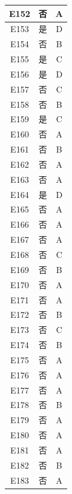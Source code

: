 \documentclass[UTF8]{ctexart}
\begin{document}
\begin{center}
\begin{longtable}{|c|c|c|}
		E152     & 否       & A        \\ \hline
		E153     & 是       & D        \\ \hline
		E154     & 否       & B        \\ \hline
		E155     & 是       & C        \\ \hline
		E156     & 是       & D        \\ \hline
		E157     & 否       & C        \\ \hline
		E158     & 否       & B        \\ \hline
		E159     & 是       & C        \\ \hline
		E160     & 否       & A        \\ \hline
		E161     & 否       & B        \\ \hline
		E162     & 否       & A        \\ \hline
		E163     & 否       & A        \\ \hline
		E164     & 是       & D        \\ \hline
		E165     & 否       & A        \\ \hline
		E166     & 否       & A        \\ \hline
		E167     & 否       & A        \\ \hline
		E168     & 否       & C        \\ \hline
		E169     & 否       & B        \\ \hline
		E170     & 否       & A        \\ \hline
		E171     & 否       & A        \\ \hline
		E172     & 否       & B        \\ \hline
		E173     & 否       & C        \\ \hline
		E174     & 否       & B        \\ \hline
		E175     & 否       & A        \\ \hline
		E176     & 否       & A        \\ \hline
		E177     & 否       & A        \\ \hline
		E178     & 否       & B        \\ \hline
		E179     & 否       & A        \\ \hline
		E180     & 否       & A        \\ \hline
		E181     & 否       & A        \\ \hline
		E182     & 否       & B        \\ \hline
		E183     & 否       & A        \\ \hline

\end{longtable}
\end{center}
\end{document}
